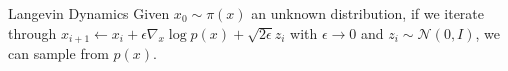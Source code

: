 \documentclass{beamer}
\begin{document}
\begin{frame}{Langevin Dynamics}
    Given $x_0 \sim \pi(x)$ an unknown distribution, if we iterate through $x_{i+1} \leftarrow x_i + \epsilon \nabla_x \log p(x) + \sqrt{2 \epsilon} z_i$ with $\epsilon \rightarrow 0$ and $z_i \sim \mathcal{N}(0,I)$, we can sample from $p(x)$.

\end{frame}
\end{document}
